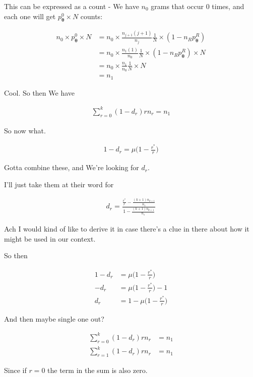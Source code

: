 \documentclass{article}
\newcommand{\vtheta}{\boldsymbol{\theta}}
\newcommand{\model}{p_{\vtheta}}
\begin{document}
		This can be expressed as a count - We have $n_0$ grams that occur 0 times, and each one will get $\model^0\times N$ counts:
		
		\begin{align}
			n_0 \times\model^0\times N &= n_0\times\frac{n_{j+1} (j+1)}{ n_j} \frac{1}{N}\times (1 - n_R\model^R) \\
			 &= n_0\times\frac{n_{1} (1)}{ n_0} \frac{1}{N}\times (1 - n_R\model^R)\times N \\
			 &= n_0\times\frac{n_{1} }{ n_0} \frac{1}{N}\times N \\
			 &= n_{1} 
		\end{align}
		
		Cool. So then We have
		
		\begin{align}
			\sum^k_{r=0} (1-d_r) r n_r = n_1
		\end{align}
		
		So now what. 
		
		\begin{align}
			1-d_r = \mu\bigg(1-\frac{r^*}{r} \bigg)
		\end{align}
		
		Gotta combine these, and We're looking for $d_r$.	
		
		I'll just take them at their word for
		
		\begin{align}
			d_r = \frac{\frac{r^*}{r} - \frac{(k+1)n_{k+1}}{n_1} }{1 - \frac{(k+1)n_{k+1}}{n_1}}
		\end{align}
		
		Ach I would kind of like to derive it in case there's a clue in there about how it might be used in our context.
		
		So then
		
		\begin{align}
			1-d_r &= \mu\bigg(1-\frac{r^*}{r} \bigg)\\
			-d_r &= \mu\bigg(1-\frac{r^*}{r} \bigg)-1\\
			d_r &= 1-\mu\bigg(1-\frac{r^*}{r} \bigg)
		\end{align}
		
		And then maybe single one out?
		
		\begin{align}
			\sum^k_{r=0} (1-d_r) r n_r &= n_1\\
			\sum^k_{r=1} (1-d_r) r n_r &= n_1
		\end{align}
		
		Since if $r=0$ the term in the sum is also zero.
		
\end{document}
